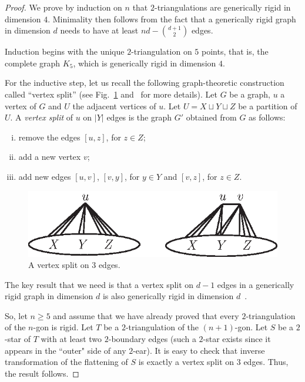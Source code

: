 \documentclass[12pt]{amsart}
\begin{document}
\begin{proof}
We prove by induction on $n$ that $2$-triangulations are generically rigid in dimension $4$. Minimality then follows from the fact that a generically rigid graph in dimension $d$ needs to have at least $nd-{d+1 \choose 2}$ edges.

Induction begins with the unique $2$-triangulation on $5$ points, that is,  the complete graph $K_5$, which is generically rigid in dimension $4$.


For the inductive step, 
let us recall the following graph-theoretic construction called ``vertex split''
(see Fig.~\ref{split} and~\cite{w-vsif-90} for more details). Let $G$ be a graph, $u$ a vertex of $G$ and $U$ the adjacent vertices of $u$. Let $U=X\sqcup Y\sqcup Z$ be a partition of $U$. A \emph{vertex split} of $u$ on $|Y|$ edges is the graph $G'$ obtained from $G$ as follows:
\begin{enumerate}[(i)]
\item remove the edges $[u,z]$, for $z\in Z$;
\item add a new vertex $v$;
\item add new edges $[u,v]$, $[v,y]$, for $y\in Y$ and $[v,z]$, for $z\in Z$.
\end{enumerate}

\begin{figure}
\centerline{\includegraphics[scale=1]{split.eps}}
\caption{\small{A vertex split on $3$ edges.}}\label{split}
\end{figure}


The key result that we need is that a vertex split on $d-1$ edges in a generically rigid graph in dimension $d$ is also generically rigid in dimension $d$~\cite{w-vsif-90}.


So, let $n\ge 5$ and assume that we have already proved that every $2$-triangulation of the $n$-gon is rigid. Let $T$ be a $2$-triangulation of the $(n+1)$-gon. Let $S$ be a $2$-star of $T$ with at least two $2$-boundary edges (such a $2$-star exists since it appears in the ``outer" side of any $2$-ear). It is easy to check that inverse transformation of the flattening of $S$ is exactly a vertex split on $3$ edges. Thus, the result follows.
\end{proof}
\end{document}
